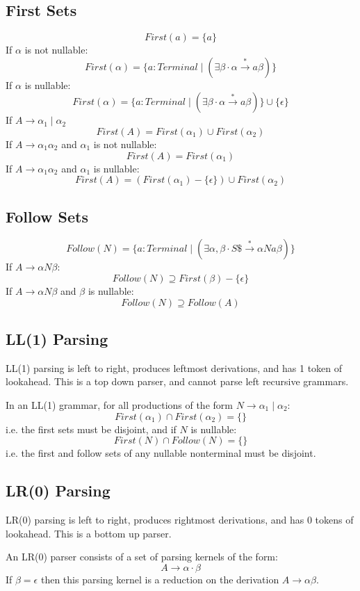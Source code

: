 \documentclass[landscape]{cheat}
\begin{document}
\begin{multicols}{3}
\subsection{First Sets}
    \[First(a) = \{ a \} \]
If $\alpha$ is not nullable:
    \[First(\alpha) = \{ a: Terminal \mid (\exists \beta \cdot \alpha \xrightarrow{*} a \beta ) \} \]
If $\alpha$ is nullable:
    \[First(\alpha) = \{ a: Terminal \mid (\exists \beta \cdot \alpha \xrightarrow{*} a \beta ) \}  \cup \{ \epsilon \}\]
If $A \rightarrow \alpha_1 \mid \alpha_2$
    \[First(A) = First(\alpha_1) \cup First(\alpha_2) \]
If $A \rightarrow \alpha_1 \alpha_2$ and $\alpha_1$ is not nullable:
    \[First(A) = First(\alpha_1) \]
If $A \rightarrow \alpha_1 \alpha_2$ and $\alpha_1$ is nullable:
    \[First(A) = (First(\alpha_1) - \{ \epsilon \} ) \cup First(\alpha_2) \]

\subsection{Follow Sets}
    \[Follow(N) = \{ a: Terminal \mid (\exists \alpha, \beta \cdot S\$ \xrightarrow{*} \alpha N a \beta) \} \]
If $A \rightarrow \alpha N \beta$:
    \[ Follow(N) \supseteq First(\beta) - \{ \epsilon \} \]
If $A \rightarrow \alpha N \beta$ and $\beta$ is nullable:
    \[ Follow(N) \supseteq Follow(A) \]

\subsection{LL(1) Parsing}
LL(1) parsing is left to right, produces leftmost derivations, and has 1 token of lookahead. This is a top down parser, and cannot parse left recursive grammars.

In an LL(1) grammar, for all productions of the form $N \rightarrow \alpha_1 \mid \alpha_2$:
\[ First(\alpha_1) \cap First(\alpha_2) = \{\} \]
i.e. the first sets must be disjoint, and if $N$ is nullable:
\[ First(N) \cap Follow(N) = \{ \} \]
i.e. the first and follow sets of any nullable nonterminal must be disjoint.

\subsection{LR(0) Parsing}
LR(0) parsing is left to right, produces rightmost derivations, and has 0 tokens of lookahead. This is a bottom up parser.

An LR(0) parser consists of a set of parsing kernels of the form:
    \[ A \rightarrow \alpha \cdot \beta \]
If $\beta = \epsilon$ then this parsing kernel is a reduction on the derivation $A \rightarrow \alpha \beta $.


\end{multicols}
\end{document}
